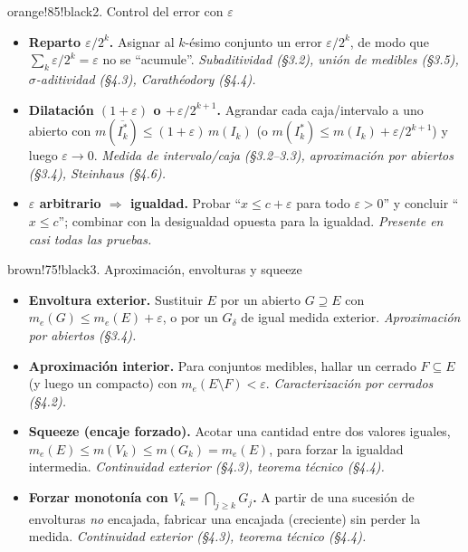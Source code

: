 \documentclass[11pt,twoside]{article}
\begin{document}
\begin{equivbox}{orange!85!black}{2. Control del error con $\varepsilon$}
\begin{itemize}[leftmargin=2em,itemsep=2pt]
\item \textbf{Reparto $\varepsilon / 2^{k}$.} Asignar al $k$-\'esimo conjunto un error $\varepsilon / 2^{k}$, de modo que $\sum_{k} \varepsilon / 2^{k} = \varepsilon$ no se ``acumule''. \hfill\textit{Subaditividad (§3.2), uni\'on de medibles (§3.5), $\sigma$-aditividad (§4.3), Carath\'eodory (§4.4).}
\item \textbf{Dilataci\'on $(1 + \varepsilon)$ o $+\,\varepsilon / 2^{k+1}$.} Agrandar cada caja/intervalo a uno abierto con $m(\overline{I_{k}^{\ast}}) \leq (1 + \varepsilon)\, m(I_{k})$ (o $m(I_{k}^{\ast}) \leq m(I_{k}) + \varepsilon / 2^{k+1}$) y luego $\varepsilon \to 0$. \hfill\textit{Medida de intervalo/caja (§3.2--3.3), aproximaci\'on por abiertos (§3.4), Steinhaus (§4.6).}
\item \textbf{$\varepsilon$ arbitrario $\Rightarrow$ igualdad.} Probar ``$x \leq c + \varepsilon$ para todo $\varepsilon > 0$'' y concluir ``$x \leq c$''; combinar con la desigualdad opuesta para la igualdad. \hfill\textit{Presente en casi todas las pruebas.}
\end{itemize}
\end{equivbox}

\begin{equivbox}{brown!75!black}{3. Aproximaci\'on, envolturas y squeeze}
\begin{itemize}[leftmargin=2em,itemsep=2pt]
\item \textbf{Envoltura exterior.} Sustituir $E$ por un abierto $G \supseteq E$ con $m_{e}(G) \leq m_{e}(E) + \varepsilon$, o por un $G_{\delta}$ de igual medida exterior. \hfill\textit{Aproximaci\'on por abiertos (§3.4).}
\item \textbf{Aproximaci\'on interior.} Para conjuntos medibles, hallar un cerrado $F \subseteq E$ (y luego un compacto) con $m_{e}(E \setminus F) < \varepsilon$. \hfill\textit{Caracterizaci\'on por cerrados (§4.2).}
\item \textbf{Squeeze (encaje forzado).} Acotar una cantidad entre dos valores iguales, $m_{e}(E) \leq m(V_{k}) \leq m(G_{k}) = m_{e}(E)$, para forzar la igualdad intermedia. \hfill\textit{Continuidad exterior (§4.3), teorema t\'ecnico (§4.4).}
\item \textbf{Forzar monoton\'ia con $V_{k} = \bigcap_{j \geq k} G_{j}$.} A partir de una sucesi\'on de envolturas \emph{no} encajada, fabricar una encajada (creciente) sin perder la medida. \hfill\textit{Continuidad exterior (§4.3), teorema t\'ecnico (§4.4).}
\end{itemize}
\end{equivbox}
\end{document}
